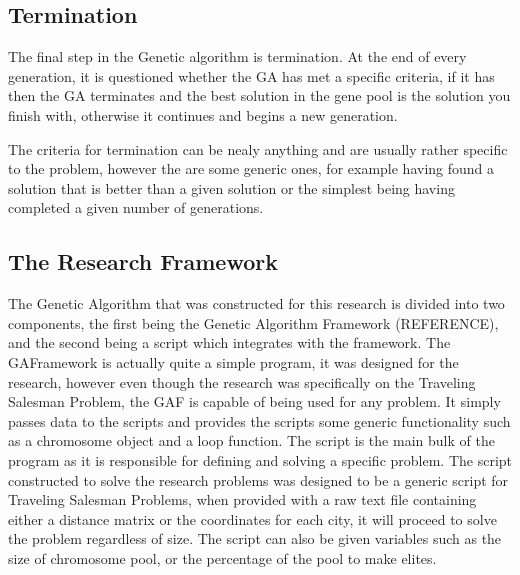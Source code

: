 \subsection{Termination}
\par
The final step in the Genetic algorithm is termination. At the end of every generation, it is questioned whether the GA has met a specific criteria, if it has then the GA terminates and the best solution in the gene pool is the solution you finish with, otherwise it continues and begins a new generation.
\par
The criteria for termination can be nealy anything and are usually rather specific to the problem, however the are some generic ones, for example having found a solution that is better than a given solution or the simplest being having completed a given number of generations.
\subsection{The Research Framework}
\par
The Genetic Algorithm that was constructed for this research is divided into two components, the first being the Genetic Algorithm Framework (REFERENCE), and the second being a script which integrates with the framework.
The GAFramework is actually quite a simple program, it was designed for the research, however even though the research was specifically on the Traveling Salesman Problem, the GAF is capable of being used for any problem. It simply passes data to the scripts and provides the scripts some generic functionality such as a chromosome object and a loop function.
The script is the main bulk of the program as it is responsible for defining and solving a specific problem. The script constructed to solve the research problems was designed to be a generic script for Traveling Salesman Problems, when provided with a raw text file containing either a distance matrix or the coordinates for each city, it will proceed to solve the problem regardless of size. The script can also be given variables such as the size of chromosome pool, or the percentage of the pool to make elites. 

